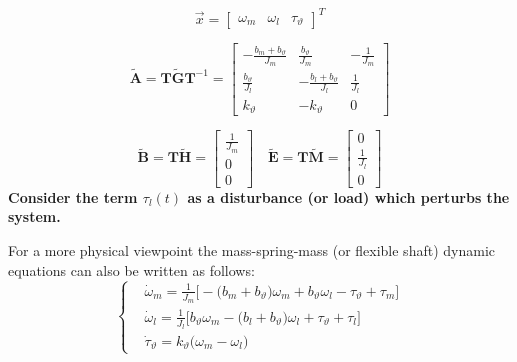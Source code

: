 \documentclass[12pt,a4paper]{scrartcl}
\begin{document}
\begin{onehalfspace}
\begin{mybox}
	\begin{equation*}
		\vec{x} = \left[\begin{matrix} \omega_m&\omega_l&\tau_{\vartheta} 
		\end{matrix} \right]^T
	\end{equation*}
	
	\begin{equation*}
		\tilde{\mathbf{A}} = \mathbf{T}\tilde{\mathbf{G}}\mathbf{T}^{-1} =
		\left[ \begin{matrix}
			-\frac{b_m+b_{\vartheta}}{J_m} & \frac{b_{\vartheta}}{J_m} & 
			-\frac{1}{J_m}\\[6pt]
			\frac{b_{\vartheta}}{J_l} & -\frac{b_l+b_{\vartheta}}{J_l} & 
			\frac{1}{J_l}\\[6pt]
			k_{\vartheta} & -k_{\vartheta} & 0
		\end{matrix}\right]
	\end{equation*}
	
	\begin{equation*}
		\tilde{\mathbf{B}} = \mathbf{T}\tilde{\mathbf{H}} =
		\left[ \begin{matrix}
			\frac{1}{J_m} \\[6pt]
			0 \\[6pt]
			0
		\end{matrix}\right]
		\quad
		\tilde{\mathbf{E}} = \mathbf{T}\tilde{\mathbf{M}} =
		\left[ \begin{matrix}
			0 \\[6pt]
			\frac{1}{J_l} \\[6pt]
			0
		\end{matrix}\right]
	\end{equation*}
	\textbf{Consider the term $\tau_l(t)$ as a disturbance (or load) which perturbs 
		the system.}
	
	\vspace{5mm}
	For a more physical viewpoint the mass-spring-mass (or flexible shaft) dynamic 
	equations can also be written as follows:
	\begin{equation}
		\left\lbrace 
		\begin{aligned}
			& \dot{\omega}_m =\frac{1}{J_m}\Big[ -\big(b_m+b_\vartheta\big)\omega_m+b_{\vartheta}\omega_l - \tau_{\vartheta} + \tau_m\Big] \\[6pt]
			& \dot{\omega}_l = \frac{1}{J_l}\Big[b_\vartheta\omega_m-\big(b_l+b_{\vartheta}\big)\omega_l+ 
			\tau_{\vartheta} + \tau_l\Big] \\[6pt]
			& \dot{\tau}_{\vartheta} = k_{\vartheta}\big(\omega_m-\omega_l\big) 
		\end{aligned}
		\right. 
	\end{equation}
\end{mybox}


\end{onehalfspace}
\end{document}
